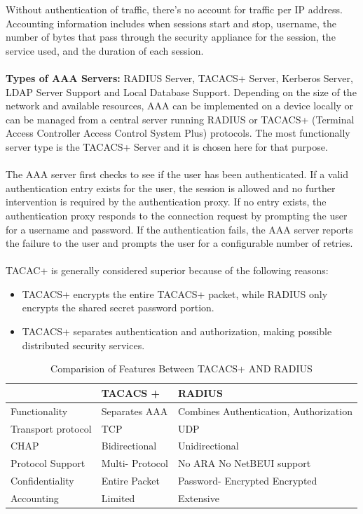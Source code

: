\documentclass[12pt]{report}
\begin{document}
Without authentication of traffic, there's no account for traffic per IP address. Accounting information includes when sessions start and stop, username, the number of bytes that pass through the security appliance for the session, the service used, and the duration of each session.
\\
\\
\textbf{Types of AAA Servers:} RADIUS Server, TACACS+ Server, Kerberos Server, LDAP Server Support and Local Database Support. Depending on the size of the network and available resources, AAA can be implemented on a device locally or can be managed from a central server running RADIUS or TACACS+ (Terminal Access Controller Access Control System Plus) protocols. The most functionally server type is the TACACS+ Server and it is chosen here for that purpose.
\\
\\
The AAA server first checks to see if the user has been authenticated. If a valid authentication entry exists for the user, the session is allowed and no further intervention is required by the authentication proxy. If no entry exists, the authentication proxy responds to the connection request by prompting the user for a username and password. If the authentication fails, the AAA server reports the failure to the user and prompts the user for a configurable number of retries.
\\
\\
TACAC+ is generally considered superior because of the following reasons:
\begin{itemize}
\item TACACS+ encrypts the entire TACACS+ packet, while RADIUS only encrypts the shared secret password portion.
\item TACACS+ separates authentication and authorization, making possible distributed security services.
\end{itemize}

\begin{table}[H]
\begin{tabular}{ | l	| l	 | l | }
\hline
  & \textbf{TACACS +} & \textbf{RADIUS} \\
  \hline
 Functionality		&  Separates AAA  	& Combines Authentication, Authorization \\
 Transport protocol 	&    TCP 		&			UDP \\
 CHAP 			& Bidirectional 		&	    Unidirectional \\
 Protocol Support      &   Multi- Protocol        &         No ARA No NetBEUI support \\
 Confidentiality      &  Entire Packet		&	Password- Encrypted Encrypted \\
 Accounting 		& Limited 			& 	Extensive \\
 \hline
 \end{tabular}
 \caption{Comparision of Features Between TACACS+ AND RADIUS\label{fig:Comparision of Features Between TACACS+ AND RADIUS}}
 \end{table}
\newpage
\end{document}
